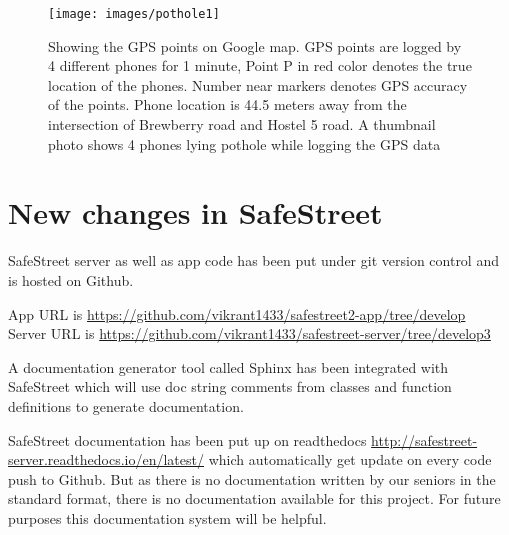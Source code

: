 \documentclass[12pt]{report}
\begin{document}
\begin{enumerate}


  \begin{figure}[h]
    \centering
    \texttt{[image: images/pothole1]}
    \caption{Showing the GPS points on Google map. GPS points are logged by 4
      different phones for 1 minute, Point P in red color denotes the true
      location of the phones. Number near markers denotes GPS accuracy
      of the points. Phone location is 44.5 meters away from the intersection of
      Brewberry road and Hostel 5 road. A thumbnail photo shows 4 phones lying
      pothole while logging the GPS data}
  \end{figure}



\end{enumerate}


\chapter{New changes in SafeStreet}

SafeStreet server as well as app code has been put under git version control and
is hosted on Github.

App URL is \url{https://github.com/vikrant1433/safestreet2-app/tree/develop} \\
Server URL is \url{https://github.com/vikrant1433/safestreet-server/tree/develop3}

A documentation generator tool called Sphinx \cite[]{sphinx} has been integrated
with SafeStreet which will use doc string comments from classes and function
definitions to generate documentation.

SafeStreet documentation has been put up on readthedocs
\url{http://safestreet-server.readthedocs.io/en/latest/} which automatically get
update on every code push to Github. But as there is no documentation written by
our seniors in the standard format, there is no documentation available for this
project. For future purposes this documentation system will be helpful.
 
\end{document}
